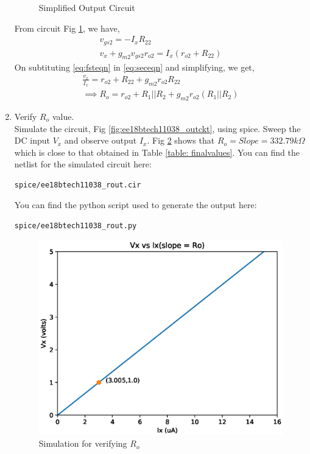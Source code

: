 \begin{enumerate}[label=\arabic*.,ref=\theenumi]
\begin{figure}[!ht]
\begin{center}
		\resizebox{\columnwidth}{!}{}
	\end{center}
\caption{Simplified Output Circuit}
\label{fig:ee18btech11038_simpout}
\end{figure}

From circuit Fig \ref{fig:ee18btech11038_simpout}, we have,
\begin{align}
\label{eq:fsteqn}
    v_{gs2} = -I_{x}R_{22}\\
\label{eq:seceqn}
    v_{x} + g_{m2}v_{gs2}r_{o2} = I_{x}(r_{o2} + R_{22})
\end{align}
On subtituting \ref{eq:fsteqn} in \ref{eq:seceqn} and simplifying, we get,
\begin{align}
    \frac{v_{x}}{I_{x}} = r_{o2} + R_{22} + g_{m2}r_{o2}R_{22}\\
\label{eq:Ro}
    \implies R_{o} =r_{o2} + R_{1}||R_{2} + g_{m2}r_{o2}(R_{1}||R_{2})
\end{align}

\item Verify $R_{o}$ value.\\
\solution Simulate the circuit, Fig \ref{fig:ee18btech11038_outckt}, using spice. Sweep the DC input $V_{x}$ and observe output $I_{x}$. Fig \ref{fig:ee18btech11038_rout} shows that $R_{o} = Slope = 332.79k\Omega $ which is close to that obtained in Table \ref{table: finalvalues}.
You can find the netlist for the simulated circuit here:
\begin{lstlisting}
spice/ee18btech11038_rout.cir
\end{lstlisting}
You can find the python script used to generate the output here:
\begin{lstlisting}
spice/ee18btech11038_rout.py
\end{lstlisting}

\begin{figure}[!ht]
\centering
\includegraphics[width=\columnwidth]{./figs/ee18btech11038_rout.eps}
\caption{Simulation for verifying $R_{o}$}
\label{fig:ee18btech11038_rout}
\end{figure}



\end{enumerate}
